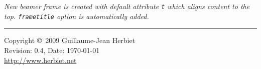 \documentclass[10pt,a4paper,landscape]{article}
\begin{document}
\begin{multicols}{4}
\emph{New beamer frame is created with default attribute \texttt{t} which aligns
content to the top. \texttt{frametitle} option is automatically added.}

\rule{0.3\linewidth}{0.25pt}
\scriptsize

Copyright \copyright\ 2009 Guillaume-Jean Herbiet\\
Revision: 0.4, Date: \today \\
\url{http://www.herbiet.net}

\end{multicols}
\end{document}
